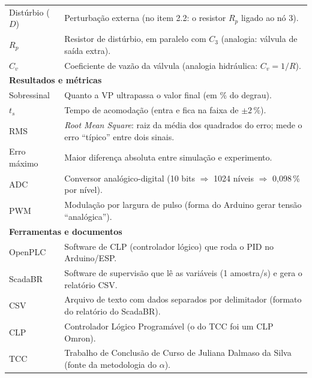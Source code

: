 \documentclass[11pt,a4paper]{article}
\begin{document}
\begin{center}
\begin{longtable}{p{2.7cm}p{12.3cm}}
Distúrbio ($D$) & Perturbação externa (no item 2.2: o resistor $R_p$ ligado ao nó 3).\\
$R_p$ & Resistor de distúrbio, em paralelo com $C_3$ (analogia: válvula de saída extra).\\
$C_v$ & Coeficiente de vazão da válvula (analogia hidráulica: $C_v=1/R$).\\
\multicolumn{2}{l}{\textbf{Resultados e métricas}}\\
Sobressinal & Quanto a VP ultrapassa o valor final (em \% do degrau).\\
$t_s$ & Tempo de acomodação (entra e fica na faixa de $\pm2\,\%$).\\
RMS & \emph{Root Mean Square}: raiz da média dos quadrados do erro; mede o erro ``típico'' entre dois sinais.\\
Erro máximo & Maior diferença absoluta entre simulação e experimento.\\
ADC & Conversor analógico-digital (10 bits $\Rightarrow$ 1024 níveis $\Rightarrow$ 0,098\,\% por nível).\\
PWM & Modulação por largura de pulso (forma do Arduino gerar tensão ``analógica'').\\
\multicolumn{2}{l}{\textbf{Ferramentas e documentos}}\\
OpenPLC & Software de CLP (controlador lógico) que roda o PID no Arduino/ESP.\\
ScadaBR & Software de supervisão que lê as variáveis (1 amostra/s) e gera o relatório CSV.\\
CSV & Arquivo de texto com dados separados por delimitador (formato do relatório do ScadaBR).\\
CLP & Controlador Lógico Programável (o do TCC foi um CLP Omron).\\
TCC & Trabalho de Conclusão de Curso de Juliana Dalmaso da Silva (fonte da metodologia do $\alpha$).\\
\bottomrule
\end{longtable}\end{center}
\end{document}
